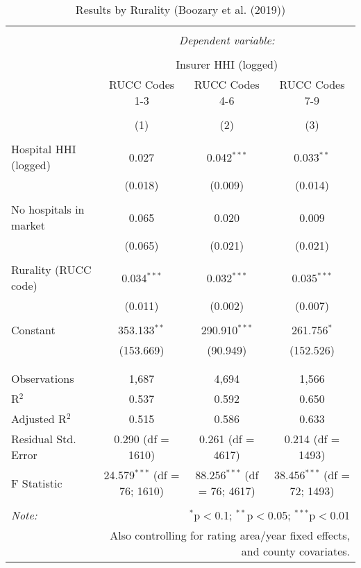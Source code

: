 
\begin{table}[!htbp] \centering 
  \caption{Results by Rurality (Boozary et al. (2019))} 
  \label{} 
\scriptsize 
\begin{tabular}{@{\extracolsep{5pt}}lccc} 
\\[-1.8ex]\hline 
\hline \\[-1.8ex] 
 & \multicolumn{3}{c}{\textit{Dependent variable:}} \\ 
\cline{2-4} 
\\[-1.8ex] & \multicolumn{3}{c}{Insurer HHI (logged)} \\ 
 & RUCC Codes 1-3 & RUCC Codes 4-6 & RUCC Codes 7-9 \\ 
\\[-1.8ex] & (1) & (2) & (3)\\ 
\hline \\[-1.8ex] 
 Hospital HHI (logged) & 0.027 & 0.042$^{***}$ & 0.033$^{**}$ \\ 
  & (0.018) & (0.009) & (0.014) \\ 
  & & & \\ 
 No hospitals in market & 0.065 & 0.020 & 0.009 \\ 
  & (0.065) & (0.021) & (0.021) \\ 
  & & & \\ 
 Rurality (RUCC code) & 0.034$^{***}$ & 0.032$^{***}$ & 0.035$^{***}$ \\ 
  & (0.011) & (0.002) & (0.007) \\ 
  & & & \\ 
 Constant & 353.133$^{**}$ & 290.910$^{***}$ & 261.756$^{*}$ \\ 
  & (153.669) & (90.949) & (152.526) \\ 
  & & & \\ 
\hline \\[-1.8ex] 
Observations & 1,687 & 4,694 & 1,566 \\ 
R$^{2}$ & 0.537 & 0.592 & 0.650 \\ 
Adjusted R$^{2}$ & 0.515 & 0.586 & 0.633 \\ 
Residual Std. Error & 0.290 (df = 1610) & 0.261 (df = 4617) & 0.214 (df = 1493) \\ 
F Statistic & 24.579$^{***}$ (df = 76; 1610) & 88.256$^{***}$ (df = 76; 4617) & 38.456$^{***}$ (df = 72; 1493) \\ 
\hline 
\hline \\[-1.8ex] 
\textit{Note:}  & \multicolumn{3}{r}{$^{*}$p$<$0.1; $^{**}$p$<$0.05; $^{***}$p$<$0.01} \\ 
 & \multicolumn{3}{r}{Also controlling for rating area/year fixed effects, and county covariates.} \\ 
\end{tabular} 
\end{table} 
